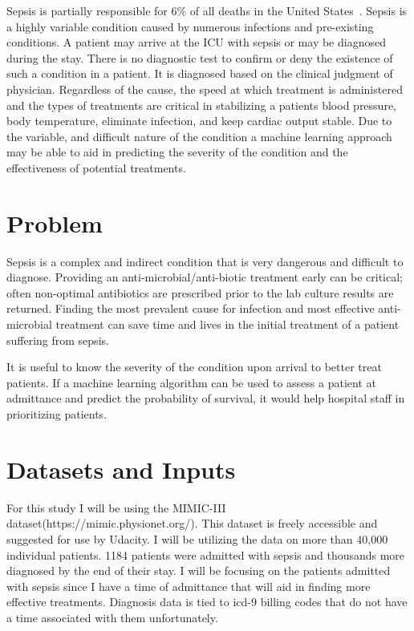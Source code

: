 \documentclass[11pt]{article}
\begin{document}
Sepsis is partially responsible for 6\% of all deaths in the United States~\cite{cdc}. Sepsis is a highly variable condition caused by numerous infections and pre-existing conditions. A patient may arrive at the ICU with sepsis or may be diagnosed during the stay. There is no diagnostic test to confirm or deny the existence of such a condition in a patient. It is diagnosed based on the clinical judgment of physician. Regardless of the cause, the speed at which treatment is administered and the types of treatments are critical in stabilizing a patients blood pressure, body temperature, eliminate infection, and keep cardiac output stable. Due to the variable, and difficult nature of the condition a machine learning approach may be able to aid in predicting the severity of the condition and the effectiveness of potential treatments.


\section{Problem}
Sepsis is a complex and indirect condition that is very dangerous and difficult to diagnose. Providing an anti-microbial/anti-biotic treatment early can be critical; often non-optimal antibiotics are prescribed prior to the lab culture results are returned. Finding the most prevalent cause for infection and most effective anti-microbial treatment can save time and lives in the initial treatment of a patient suffering from sepsis.

It is useful to know the severity of the condition upon arrival to better treat patients. If a machine learning algorithm can be used to assess a patient at admittance and predict the probability of survival, it would help hospital staff in prioritizing patients.

\section{Datasets and Inputs}
For this study I will be using the MIMIC-III dataset(https://mimic.physionet.org/). This dataset is freely accessible and suggested for use by Udacity. I will be utilizing the data on more than 40,000 individual patients. 1184 patients were admitted with sepsis and thousands more diagnosed by the end of their stay. I will be focusing on the patients admitted with sepsis since I have a time of admittance that will aid in finding more effective treatments. Diagnosis data is tied to icd-9 billing codes that do not have a time associated with them unfortunately.
\end{document}
